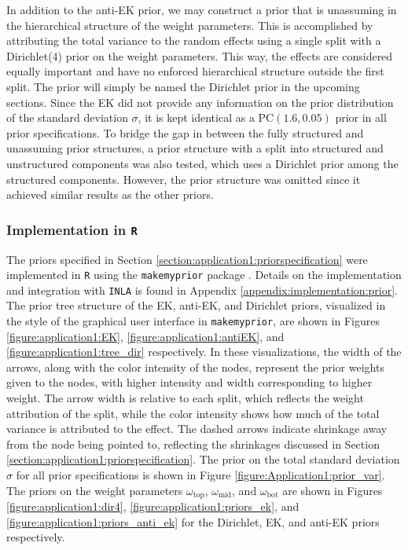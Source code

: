 In addition to the anti-EK prior, we may construct a prior that is unassuming in the hierarchical structure of the weight parameters. This is accomplished by attributing the total variance to the random effects using a single split with a Dirichlet(4) prior on the weight parameters. This way, the effects are considered equally important and have no enforced hierarchical structure outside the first split. The prior will simply be named the Dirichlet prior in the upcoming sections. Since the EK did not provide any information on the prior distribution of the standard deviation $\sigma$, it is kept identical as a $\text{PC}(1.6, 0.05)$ prior in all prior specifications. To bridge the gap in between the fully structured and unassuming prior structures, a prior structure with a split into structured and unstructured components was also tested, which uses a Dirichlet prior among the structured components. However, the prior structure was omitted since it achieved similar results as the other priors.

\subsubsection{Implementation in \texttt{R}}
\label{section:application1:prior-mmp}
The priors specified in Section \ref{section:application1:priorspecification} were implemented in \texttt{R} using the \texttt{makemyprior} package \citep{MMPPackage, MMP}. Details on the implementation and integration with \texttt{INLA} is found in Appendix \ref{appendix:implementation:prior}. The prior tree structure of the EK, anti-EK, and Dirichlet priors, visualized in the style of the graphical user interface in \texttt{makemyprior}, are shown in Figures \ref{figure:application1:EK}, \ref{figure:application1:antiEK}, and \ref{figure:application1:tree_dir} respectively. In these visualizations, the width of the arrows, along with the color intensity of the nodes, represent the prior weights given to the nodes, with higher intensity and width corresponding to higher weight. The arrow width is relative to each split, which reflects the weight attribution of the split, while the color intensity shows how much of the total variance is attributed to the effect. The dashed arrows indicate shrinkage away from the node being pointed to, reflecting the shrinkages discussed in Section \ref{section:application1:priorspecification}. The prior on the total standard deviation $\sigma$ for all prior specifications is shown in Figure \ref{figure:Application1:prior_var}. The priors on the weight parameters $\omega_{\text{top}}$, $\omega_{\text{mid}}$, and $\omega_{\text{bot}}$ are shown in Figures \ref{figure:application1:dir4}, \ref{figure:application1:priors_ek}, and  \ref{figure:application1:priors_anti_ek} for the Dirichlet, EK, and anti-EK priors respectively. 

